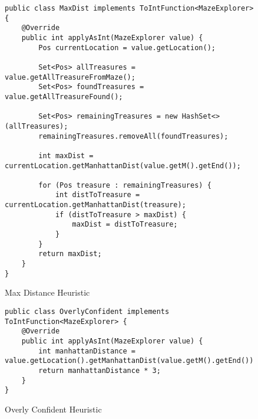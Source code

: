 \documentclass[12pt]{article}
\begin{document}
\begin{figure}[h!]

\begin{verbatim}
public class MaxDist implements ToIntFunction<MazeExplorer> {
    @Override
    public int applyAsInt(MazeExplorer value) {
        Pos currentLocation = value.getLocation();

        Set<Pos> allTreasures = value.getAllTreasureFromMaze();
        Set<Pos> foundTreasures = value.getAllTreasureFound();

        Set<Pos> remainingTreasures = new HashSet<>(allTreasures);
        remainingTreasures.removeAll(foundTreasures);

        int maxDist = currentLocation.getManhattanDist(value.getM().getEnd());

        for (Pos treasure : remainingTreasures) {
            int distToTreasure = currentLocation.getManhattanDist(treasure);
            if (distToTreasure > maxDist) {
                maxDist = distToTreasure;
            }
        }
        return maxDist;
    }
}
\end{verbatim}
\caption{Max Distance Heuristic}
\end{figure}

\begin{figure}[h!]
    
\begin{verbatim}
public class OverlyConfident implements ToIntFunction<MazeExplorer> {
    @Override
    public int applyAsInt(MazeExplorer value) {
        int manhattanDistance = value.getLocation().getManhattanDist(value.getM().getEnd());
        return manhattanDistance * 3;
    }
}

\end{verbatim}
\caption{Overly Confident Heuristic}
\end{figure}
\end{document}
